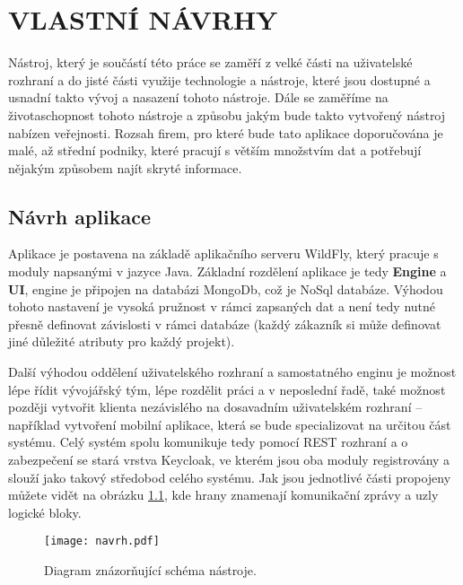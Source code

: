 \chapter{VLASTNÍ NÁVRHY}
\par Nástroj, který je součástí této práce se zaměří z velké části na uživatelské rozhraní a do jisté části využije technologie a nástroje, které jsou dostupné a usnadní takto vývoj a nasazení tohoto nástroje. Dále se zaměříme na životaschopnost tohoto nástroje a způsobu jakým bude takto vytvořený nástroj nabízen veřejnosti. Rozsah firem, pro které bude tato aplikace doporučována je malé, až střední podniky, které pracují s větším množstvím dat a potřebují nějakým způsobem najít skryté informace.

\section{Návrh aplikace}
\par Aplikace je postavena na základě aplikačního serveru WildFly, který pracuje s moduly napsanými v jazyce Java. Základní rozdělení aplikace je tedy \textbf{Engine} a \textbf{UI}, engine je připojen na databázi MongoDb, což je NoSql databáze. Výhodou tohoto nastavení je vysoká pružnost v rámci zapsaných dat a není tedy nutné přesně definovat závislosti v rámci databáze (každý zákazník si může definovat jiné důležité atributy pro každý projekt).
\par Další výhodou oddělení uživatelského rozhraní a samostatného enginu je možnost lépe řídit vývojářský tým, lépe rozdělit práci a v neposlední řadě, také možnost později vytvořit klienta nezávislého na dosavadním uživatelském rozhraní -- například vytvoření mobilní aplikace, která se bude specializovat na určitou část systému. Celý systém spolu komunikuje tedy pomocí REST rozhraní a o zabezpečení se stará vrstva Keycloak, ve kterém jsou oba moduly registrovány a slouží jako takový středobod celého systému. Jak jsou jednotlivé části propojeny můžete vidět na obrázku \ref{schema}, kde hrany znamenají komunikační zprávy a uzly logické bloky.

\begin{figure}[!htp]
\centering
\texttt{[image: navrh.pdf]}
\caption{Diagram znázorňující schéma nástroje.}
\label{schema}
\end{figure}

